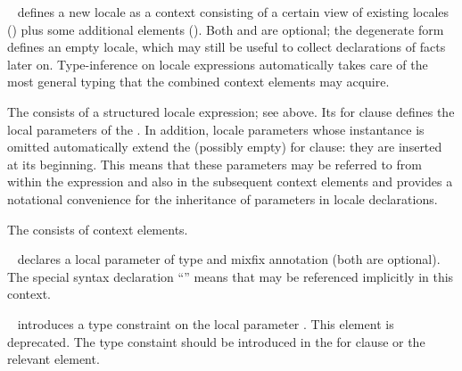\begin{isabellebody}
\begin{isamarkuptext}
  \begin{description}
  
  \item \hyperlink{command.locale}{\mbox{}}~ defines a
  new locale  as a context consisting of a certain view of
  existing locales () plus some additional elements
  ().  Both  and  are optional;
  the degenerate form \hyperlink{command.locale}{\mbox{}}~ defines an empty
  locale, which may still be useful to collect declarations of facts
  later on.  Type-inference on locale expressions automatically takes
  care of the most general typing that the combined context elements
  may acquire.

  The  consists of a structured locale expression; see
   above.  Its for clause defines the local
  parameters of the .  In addition, locale parameters
  whose instantance is omitted automatically extend the (possibly
  empty) for clause: they are inserted at its beginning.  This means
  that these parameters may be referred to from within the expression
  and also in the subsequent context elements and provides a
  notational convenience for the inheritance of parameters in locale
  declarations.

  The  consists of context elements.

  \begin{description}

  \item \hyperlink{element.fixes}{\mbox{}}~ declares a local
  parameter of type \isa{{\isasymtau}} and mixfix annotation  (both
  are optional).  The special syntax declaration ``\isa{{\isachardoublequote}{\isacharparenleft}{\isasymSTRUCTURE}{\isacharparenright}{\isachardoublequote}}'' means that  may be referenced
  implicitly in this context.

  \item \hyperlink{element.constrains}{\mbox{}}~ introduces a type
  constraint \isa{{\isasymtau}} on the local parameter .  This
  element is deprecated.  The type constaint should be introduced in
  the for clause or the relevant \hyperlink{element.fixes}{\mbox{}} element.


\end{description}
\end{description}
\end{isamarkuptext}
\end{isabellebody}
